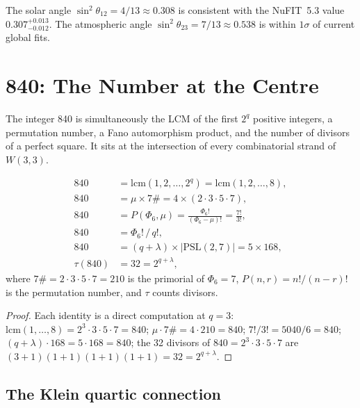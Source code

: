 The solar angle $\sin^2\theta_{12}=4/13\approx 0.308$ is consistent
with the NuFIT~5.3 value $0.307^{+0.013}_{-0.012}$.  The atmospheric
angle $\sin^2\theta_{23}=7/13\approx 0.538$ is within $1\sigma$ of
current global fits.

\section{840: The Number at the Centre}
\label{sec:840}

The integer 840 is simultaneously the LCM of the first $2^q$ positive
integers, a permutation number, a Fano automorphism product, and the
number of divisors of a perfect square.  It sits at the intersection
of every combinatorial strand of $W(3,3)$.

\begin{theorem}
\label{thm:840}
\begin{align}
  840 &= \mathrm{lcm}(1,2,\ldots,2^q)
       = \mathrm{lcm}(1,2,\ldots,8), \label{eq:840_lcm}\\
  840 &= \mu \times 7\#
       = 4 \times (2\cdot 3\cdot 5\cdot 7), \label{eq:840_primorial}\\
  840 &= P(\Phi_6,\mu)
       = \frac{\Phi_6!}{(\Phi_6-\mu)!}
       = \frac{7!}{3!}, \label{eq:840_perm}\\
  840 &= \Phi_6! \,/\, q!, \label{eq:840_fac}\\
  840 &= (q+\lambda) \times |\mathrm{PSL}(2,7)|
       = 5 \times 168, \label{eq:840_psl}\\
  \tau(840) &= 32 = 2^{q+\lambda}, \label{eq:840_tau}
\end{align}
where $7\#=2\cdot 3\cdot 5\cdot 7=210$ is the primorial of $\Phi_6=7$,
$P(n,r)=n!/(n-r)!$ is the permutation number, and $\tau$ counts divisors.
\end{theorem}

\begin{proof}
Each identity is a direct computation at $q=3$:
$\mathrm{lcm}(1,\ldots,8) = 2^3\cdot 3\cdot 5\cdot 7 = 840$;
$\mu\cdot 7\# = 4\cdot 210 = 840$;
$7!/3! = 5040/6=840$;
$(q+\lambda)\cdot 168 = 5\cdot 168=840$;
the 32 divisors of $840=2^3\cdot 3\cdot 5\cdot 7$ are
$(3+1)(1+1)(1+1)(1+1)=32=2^{q+\lambda}$.
\end{proof}

\subsection{The Klein quartic connection}

